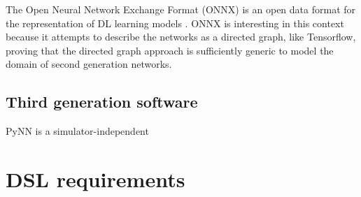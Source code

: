 \documentclass[report.tex]{subfiles}
\begin{document}
The Open Neural Network Exchange Format (ONNX) is an open data format for the representation
of \gls{DL} learning models \cite{ONNX2018}. 
ONNX is interesting in this context because it attempts to describe the networks as 
a directed graph, like Tensorflow, proving that the directed graph approach is 
sufficiently generic to model the domain of second generation networks.

\subsection{Third generation software}


PyNN is a simulator-independent

\section{DSL requirements} \label{sec:requirements}




\end{document}
